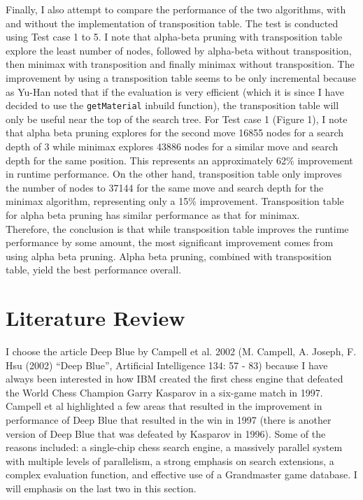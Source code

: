 \documentclass[9.5pt]{extarticle}
\begin{document}
Finally, I also attempt to compare the performance of the two algorithms, with and without the implementation of transposition table. The test is conducted using Test case 1 to 5. I note that alpha-beta pruning with transposition table explore the least number of nodes, followed by alpha-beta without transposition, then minimax with transposition and finally minimax without transposition. The improvement by using a transposition table seems to be only incremental because as Yu-Han noted that if the evaluation is very efficient (which it is since I have decided to use the \verb`getMaterial` inbuild function), the transposition table will only be useful near the top of the search tree. For Test case 1 (Figure 1), I note that alpha beta pruning explores for the second move 16855 nodes for a search depth of 3 while minimax explores 43886 nodes for a similar move and search depth for the same position. This represents an approximately 62\% improvement in runtime performance. On the other hand, transposition table only improves the number of nodes to 37144 for the same move and search depth for the minimax algorithm, representing only a 15\% improvement. Transposition table for alpha beta pruning has similar performance as that for minimax.\\

Therefore, the conclusion is that while transposition table improves the runtime performance by some amount, the most significant improvement comes from using alpha beta pruning. Alpha beta pruning, combined with transposition table, yield the best performance overall.\\

\section{Literature Review}

I choose the article Deep Blue by Campell et al. 2002 (M. Campell, A. Joseph, F. Hsu (2002) ``Deep Blue'', Artificial Intelligence 134: 57 - 83) because I have always been interested in how IBM created the first chess engine that defeated the World Chess Champion Garry Kasparov in a six-game match in 1997.\\

Campell et al highlighted a few areas that resulted in the improvement in performance of Deep Blue that resulted in the win in 1997 (there is another version of Deep Blue that was defeated by Kasparov in 1996). Some of the reasons included: a single-chip chess search engine, a massively parallel system with multiple levels of parallelism, a strong emphasis on search extensions, a complex evaluation function, and effective use of a Grandmaster game database. I will emphasis on the last two in this section.\\
\end{document}
